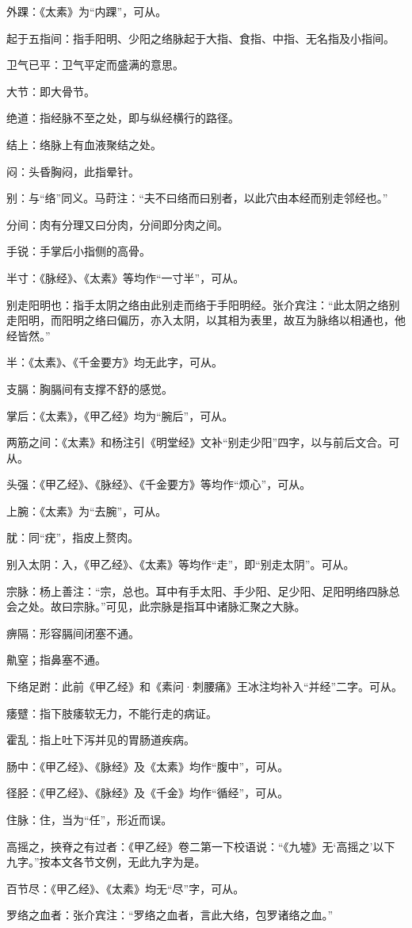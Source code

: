 \documentclass[12pt]{ctexbook}%
\begin{document}

\begin{jiaozhu}
  \item 外踝：《太素》为“内踝”，可从。
  \item 起于五指间：指手阳明、少阳之络脉起于大指、食指、中指、无名指及小指间。
  \item 卫气已平：卫气平定而盛满的意思。
  \item 大节：即大骨节。
  \item 绝道：指经脉不至之处，即与纵经横行的路径。
  \item 结上：络脉上有血液聚结之处。
  \item 闷：头昏胸闷，此指晕针。
  \item 别：与“络”同义。马莳注：“夫不曰络而曰别者，以此穴由本经而别走邻经也。”
  \item 分间：肉有分理又曰分肉，分间即分肉之间。
  \item 手锐：手掌后小指侧的高骨。
  \item 半寸：《脉经》、《太素》等均作“一寸半”，可从。
  \item 别走阳明也：指手太阴之络由此别走而络于手阳明经。张介宾注：“此太阴之络别走阳明，而阳明之络曰偏历，亦入太阴，以其相为表里，故互为脉络以相通也，他经皆然。”
  \item 半：《太素》、《千金要方》均无此字，可从。
  \item 支膈：胸膈间有支撑不舒的感觉。
  \item 掌后：《太素》，《甲乙经》均为“腕后”，可从。
  \item 两筋之间：《太素》和杨注引《明堂经》文补“别走少阳”四字，以与前后文合。可从。
  \item 头强：《甲乙经》、《脉经》、《千金要方》等均作“烦心”，可从。
  \item 上腕：《太素》为“去腕”，可从。
  \item 肬：同“疣”，指皮上赘肉。
  \item 别入太阴：入，《甲乙经》、《太素》等均作“走”，即“别走太阴”。可从。
  \item 宗脉：杨上善注：“宗，总也。耳中有手太阳、手少阳、足少阳、足阳明络四脉总会之处。故曰宗脉。”可见，此宗脉是指耳中诸脉汇聚之大脉。
  \item 痹隔：形容膈间闭塞不通。
  \item 鼽窒；指鼻塞不通。
  \item 下络足跗：此前《甲乙经》和《素问·刺腰痛》王冰注均补入“并经”二字。可从。
  \item 痿躄：指下肢痿软无力，不能行走的病证。
  \item 霍乱：指上吐下泻并见的胃肠道疾病。
  \item 肠中：《甲乙经》、《脉经》及《太素》均作“腹中”，可从。
  \item 径胫：《甲乙经》、《脉经》及《千金》均作“循经”，可从。
  \item 住脉：住，当为“任”，形近而误。
  \item 高摇之，挾脊之有过者：《甲乙经》卷二第一下校语说：“《九墟》无‘高摇之’以下九字。”按本文各节文例，无此九字为是。
  \item 百节尽：《甲乙经》、《太素》均无“尽”字，可从。
  \item 罗络之血者：张介宾注：“罗络之血者，言此大络，包罗诸络之血。”
\end{jiaozhu}
\end{document}
